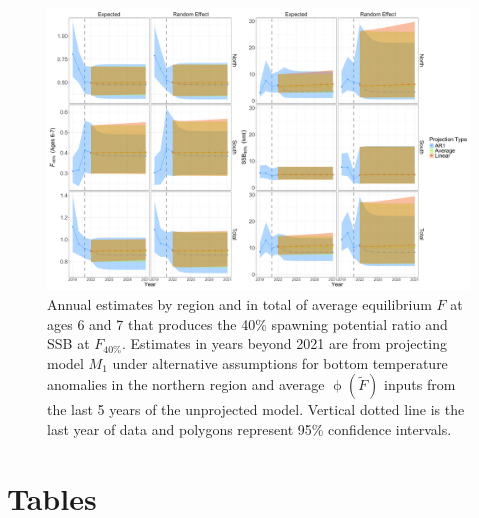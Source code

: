 \documentclass[
]{article}
\begin{document}
\begin{landscape}

\begin{figure}

{\centering \includegraphics[height=0.95\textheight]{proj_brps} 

}

\caption{Annual estimates by region and in total of average equilibrium $F$ at ages 6 and 7 that produces the 40\% spawning potential ratio and SSB at $F_{40\%}$. Estimates in years beyond 2021 are from projecting model $M_1$ under alternative assumptions for bottom temperature anomalies in the northern region and average $\upphi(\widetilde{F})$ inputs from the last 5 years of the unprojected model. Vertical dotted line is the last year of data and polygons represent 95\% confidence intervals.}\label{fig:brps-proj}
\end{figure}

\end{landscape}

\clearpage

\setcounter{table}{0}
\renewcommand\thetable{\arabic{table}}

\hypertarget{tables}{%
\section*{Tables}\label{tables}}
\end{document}
